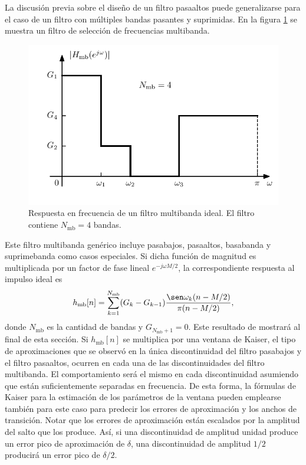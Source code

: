 \documentclass[a4paper]{report}
\begin{document}
La discusión previa sobre el diseño de un filtro pasaaltos puede generalizarse para el caso de un filtro con múltiples bandas pasantes y suprimidas. En la figura \ref{fig:filter_design_windowing_multiband} se muestra un filtro de selección de frecuencias multibanda. 
\begin{figure}[!htb]
  \begin{minipage}[c]{0.64\textwidth}
    \includegraphics[width=\textwidth]{figuras/filter_design_windowing_multiband.pdf}
  \end{minipage}\hfill
  \begin{minipage}[c]{0.36\textwidth}
    \caption{
      Respuesta en frecuencia de un filtro multibanda ideal. El filtro contiene \(N_\textrm{mb}=4\) bandas.
    }\label{fig:filter_design_windowing_multiband}
  \end{minipage}
\end{figure}
Este filtro multibanda genérico incluye pasabajos, pasaaltos, basabanda y suprimebanda como casos especiales. Si dicha función de magnitud es multiplicada por un factor de fase lineal \(e^{-j\omega M/2}\), la correspondiente respuesta al impulso ideal es
\begin{equation}\label{eq:filter_design_windowing_multiband_impulse_response}
 h_\textrm{mb}[n]=\sum_{k=1}^{N_\textrm{mb}}(G_k-G_{k-1})\frac{\sen\omega_k(n-M/2)}{\pi(n-M/2)},
\end{equation}
donde \(N_\textrm{mb}\) es la cantidad de bandas y \(G_{N_\textrm{mb}+1}=0\). Este resultado de mostrará al final de esta sección. Si \(h_\textrm{mb}[n]\) se multiplica por una ventana de Kaiser, el tipo de aproximaciones que se observó en la única discontinuidad del filtro pasabajos y el filtro pasaaltos, ocurren en cada una de las discontinuidades del filtro multibanda. El comportamiento será el mismo en cada discontinuidad asumiendo que están suficientemente separadas en frecuencia. De esta forma, la fórmulas de Kaiser para la estimación de los parámetros de la ventana pueden emplearse también para este caso para predecir los errores de aproximación y los anchos de transición. Notar que los errores de aproximación están escalados por la amplitud del salto que los produce. Así, si una discontinuidad de amplitud unidad produce un error pico de aproximación de \(\delta\), una discontinuidad de amplitud \(1/2\) producirá un error pico de \(\delta/2\).
\end{document}
